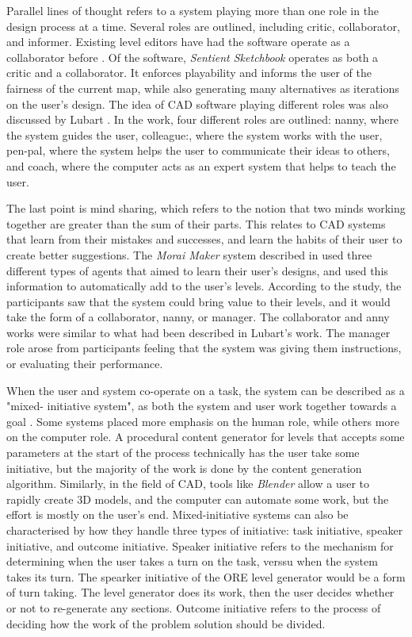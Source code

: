 Parallel lines of thought refers to a system playing more than one role in the design 
process at a time. Several roles are outlined, including critic, collaborator, and informer.
Existing level editors have had the software operate as a collaborator before \cite{guzdial2019, liapis2013, smith2010}.
Of the software, \emph{Sentient Sketchbook} operates as both a critic and a collaborator. It
enforces playability and informs the user of the fairness of the current map, while also
generating many alternatives as iterations on the user's design. The idea of CAD software
playing different roles was also discussed by Lubart \cite{lubart2005}. In the work, four
different roles are outlined: nanny, where the system guides the user, colleague:, where the
system works with the user, pen-pal, where the system helps the user to communicate their
ideas to others, and coach, where the computer acts as an expert system that helps to teach
the user.

The last point is mind sharing, which refers to the notion that two minds working together
are greater than the sum of their parts. This relates to CAD systems that learn from their
mistakes and successes, and learn the habits of their user to create better suggestions.
The \emph{Morai Maker} system described in \cite{guzdial2019} used three different types of
agents that aimed to learn their user's designs, and used this information to automatically
add to the user's levels. According to the study, the participants saw that the system could
bring value to their levels, and it would take the form of a collaborator, nanny, or manager.
The collaborator and anny works were similar to what had been described in Lubart's work.
The manager role arose from participants feeling that the system was giving them instructions,
or evaluating their performance.

When the user and system co-operate on a task, the system can be described as a "mixed-
initiative system", as both the system and user work together towards a goal \cite[p191-200]{shaker2016}.
Some systems placed more emphasis on the human role, while others more on the computer role.
A procedural content generator for levels that accepts some parameters at the start of the
process technically has the user take some initiative, but the majority of the work is done
by the content generation algorithm. Similarly, in the field of CAD, tools like \emph{Blender}
allow a user to rapidly create 3D models, and the computer can automate some work, but the effort
is mostly on the user's end. Mixed-initiative systems can also be characterised by how they
handle three types of initiative: task initiative, speaker initiative, and outcome initiative.
Speaker initiative refers to the mechanism for determining when the user takes a turn on
the task, verssu when the system takes its turn. The spearker initiative of the ORE level
generator \cite{mawhorter2010} would be a form of turn taking. The level generator does its
work, then the user decides whether or not to re-generate any sections. Outcome initiative
refers to the process of deciding how the work of the problem solution should be divided.

